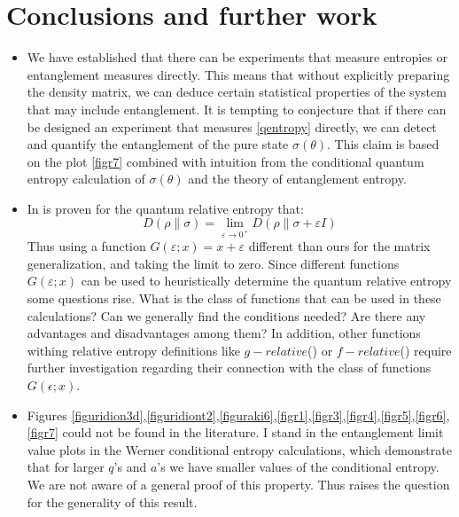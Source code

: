 \chapter{Conclusions and further work}
\begin{itemize}
\item We have established that there can be experiments that measure entropies or entanglement measures directly. This means that without explicitly preparing the density matrix, we can deduce certain statistical properties of the system that may include entanglement. It is tempting to conjecture that if there can be designed an experiment that measures \ref{qentropy} directly, we can detect and quantify the entanglement of the pure state $\sigma(\theta)$. This claim is based on the plot \ref{figr7} combined with intuition from the conditional quantum entropy calculation of $\sigma(\theta)$ and the theory of entanglement entropy.
\item In \citep{wilde2013quantum} is proven for the quantum relative entropy that:
\begin{equation}
D(\rho \| \sigma)=\lim _{\varepsilon \to 0^{+}} D(\rho \| \sigma+\varepsilon I)
\end{equation}
Thus using a function $G(\varepsilon ;x)=x+\varepsilon$ different than ours for the matrix generalization, and taking the limit to zero. Since different functions $G(\varepsilon;x)$ can be used to heuristically determine the quantum relative entropy some questions rise. What is the class of functions that can be used in these calculations? Can we generally find the conditions needed? Are there any advantages and disadvantages among them? In addition, other functions withing relative entropy definitions like $g-relative$(\citep{holevo2012quantum}) or $f-relative$(\citep{hayashi2016quantum}) require further investigation regarding their connection with the class of functions $G(\epsilon;x)$.
\item Figures \ref{figuridion3d},\ref{figuridiont2},\ref{figuraki6},\ref{figr1},\ref{figr3},\ref{figr4},\ref{figr5},\ref{figr6},\ref{figr7} could not be found in the literature. I stand in the entanglement limit value plots in the Werner conditional entropy calculations, which demonstrate that for larger $q$'s and $a$'s we have smaller values of the conditional entropy. We are not aware of a general proof of this property. Thus raises the question for the generality of this result.
\end{itemize}

